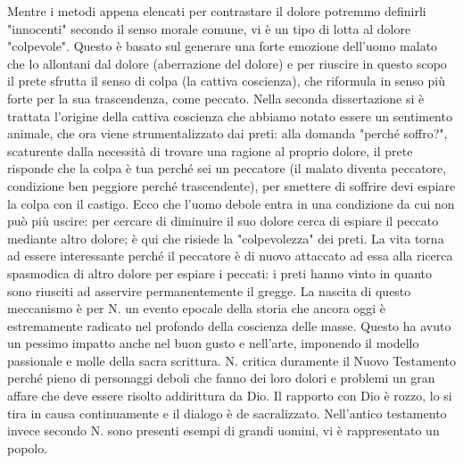 \documentclass[10pt,a4paper]{article}
\begin{document}
Mentre i metodi appena elencati per contrastare il dolore potremmo definirli "innocenti" secondo il senso morale comune, vi è un tipo di lotta al dolore "colpevole". Questo è basato sul generare una forte emozione dell'uomo malato che lo allontani dal dolore (aberrazione del dolore) e per riuscire in questo scopo il prete sfrutta il senso di colpa (la cattiva coscienza), che riformula in senso più forte per la sua trascendenza, come peccato. Nella seconda dissertazione si è trattata l'origine della cattiva coscienza che abbiamo notato essere un sentimento animale, che ora viene strumentalizzato dai preti: alla domanda "perché soffro?", scaturente dalla necessità di trovare una ragione al proprio dolore, il prete risponde che la colpa è tua perché sei un peccatore (il malato diventa peccatore, condizione ben peggiore perché trascendente), per smettere di soffrire devi espiare la colpa con il castigo. Ecco che l'uomo debole entra in una condizione da cui non può più uscire: per cercare di diminuire il suo dolore cerca di espiare il peccato mediante altro dolore; è qui che risiede la "colpevolezza" dei preti. La vita torna ad essere interessante perché il peccatore è di nuovo attaccato ad essa alla ricerca spasmodica di altro dolore per espiare i peccati: i preti hanno vinto in quanto sono riusciti ad asservire permanentemente il gregge. La nascita di questo meccanismo è per N. un evento epocale della storia che ancora oggi è estremamente radicato nel profondo della coscienza delle masse.
Questo ha avuto un pessimo impatto anche nel buon gusto e nell'arte, imponendo il modello passionale e molle della sacra scrittura. N. critica duramente il Nuovo Testamento perché pieno di personaggi deboli che fanno dei loro dolori e problemi un gran affare che deve essere risolto addirittura da Dio. Il rapporto con Dio è rozzo, lo si tira in causa continuamente e il dialogo è de sacralizzato. Nell'antico testamento invece secondo N. sono presenti esempi di grandi uomini, vi è rappresentato un popolo.
\end{document}
